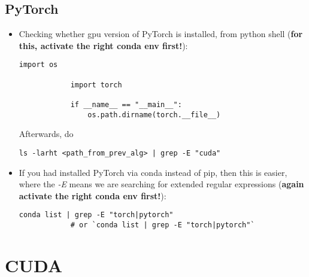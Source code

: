 \documentclass[12pt, a4paper]{article}
\numberwithin{equation}{section}
\theoremstyle{definition}
\theoremstyle{definition}
\begin{document}
		\subsection{PyTorch}
	
	\begin{itemize} 		
		\item Checking whether gpu version of PyTorch is installed, from python shell (\textbf{for this, activate the right conda env first!}): 

		\begin{lstlisting}[style=mystylepython, label=alg:find_out_torch_version, xleftmargin=\parindent]
			import os
			
			import torch 
			
			if __name__ == "__main__": 
				os.path.dirname(torch.__file__)
		\end{lstlisting}
	
		Afterwards, do 
		
		\begin{lstlisting}[style=mystylebash, label=alg:find_out_torch_version_ctd, xleftmargin=\parindent]
			ls -larht <path_from_prev_alg> | grep -E "cuda"
		\end{lstlisting}

		\item If you had installed PyTorch via conda instead of pip, then this is easier, where the \textit{-E} means we are searching for extended regular expressions (\textbf{again activate the right conda env first!}):
		
		\begin{lstlisting}[style=mystylebash, label=alg:conda__find_out_torch_version, xleftmargin=\parindent]
			conda list | grep -E "torch|pytorch" 
			# or `conda list | grep -E "torch|pytorch"`
		\end{lstlisting}
	
	\end{itemize} 
	
	\newpage 
	
	\section{CUDA}
	
\end{document}
